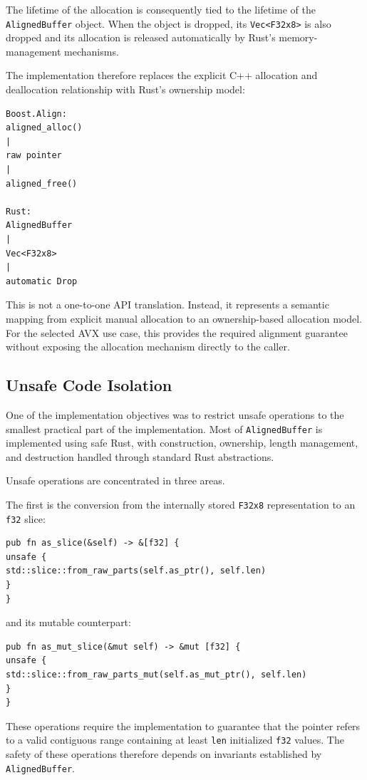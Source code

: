 The lifetime of the allocation is consequently tied to the lifetime of the \lstinline|AlignedBuffer| object. 
When the object is dropped, its \lstinline|Vec<F32x8>| is also dropped and its allocation is released
automatically by Rust's memory-management mechanisms.

The implementation therefore replaces the explicit C++ allocation and deallocation relationship with Rust's ownership 
model:

\begin{verbatim}
Boost.Align:
aligned_alloc()
|
raw pointer
|
aligned_free()

Rust:
AlignedBuffer
|
Vec<F32x8>
|
automatic Drop
\end{verbatim}

This is not a one-to-one API translation. Instead, it represents a semantic mapping from explicit manual allocation to 
an ownership-based allocation model. For the selected AVX use case, this provides the required alignment guarantee 
without exposing the allocation mechanism directly to the caller.

\subsection{Unsafe Code Isolation}

One of the implementation objectives was to restrict unsafe operations to the smallest practical part of the 
implementation. Most of \lstinline|AlignedBuffer| is implemented using safe Rust, with construction, ownership, 
length management, and destruction handled through standard Rust abstractions.

Unsafe operations are concentrated in three areas.

The first is the conversion from the internally stored
\lstinline|F32x8| representation to an \lstinline|f32| slice:

\begin{lstlisting}[style=rustblock]
pub fn as_slice(&self) -> &[f32] {
unsafe {
std::slice::from_raw_parts(self.as_ptr(), self.len)
}
}
\end{lstlisting}

and its mutable counterpart:

\begin{lstlisting}[style=rustblock]
pub fn as_mut_slice(&mut self) -> &mut [f32] {
unsafe {
std::slice::from_raw_parts_mut(self.as_mut_ptr(), self.len)
}
}
\end{lstlisting}

These operations require the implementation to guarantee that the pointer refers to a valid contiguous range containing 
at least \lstinline|len| initialized \lstinline|f32| values. The safety of these operations therefore depends on 
invariants established by \lstinline|AlignedBuffer|.

